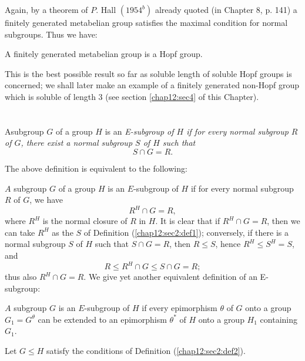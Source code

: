 Again, by a theorem of $P$. Hall $(1954^b)$ already quoted (in Chapter
8, p. 141) a finitely generated metabelian group satisfies the
maximal condition for normal subgroups. Thus we have: 
\begin{corollary}\label{chap12:sec1:coro2}%
  A finitely generated metabelian group is a Hopf group.
\end{corollary}

This is the best possible result so far as soluble length of soluble
Hopf groups is concerned; we shall later make an example of a finitely
generated non-Hopf group which is soluble of length 3 (see section
\ref{chap12:sec4} of this Chapter). 

\section{}\label{chap12:sec2}%

\setcounter{defn}{0}
\begin{defn}\label{chap12:sec2:def1} %
  A\pageoriginale subgroup $G$ of a group $H$ is an \em{E-subgroup} of $H$ if for
  every normal subgroup $R$ of $G$, there exist a normal subgroup $S$
  of $H$ such that  
  $$
  S \cap G=R. 
  $$
\end{defn}

The above definition is equivalent to the following:
\begin{defn}\label{chap12:sec2:def2} %
  $A$ subgroup $G$ of a group $H$ is an $E$-subgroup of $H$ if for
  every normal subgroup $R$ of $G$, we have  
  $$
  R^H \cap G=R,
  $$
  where $R^H$ is the normal closure of $R$ in $H$. It is clear that if
  $R^H \cap G=R$, then we can take $R^H$ as the $S$ of Definition
  (\ref{chap12:sec2:def1}); conversely, if there is a normal subgroup $S$ of $H$ such
  that $S \cap G=R$, then $R \le S$, hence $R^H \le S^H =S$, and  
  $$
  R \le R^H \cap G \le S \cap G = R ;
  $$
  thus also $R^H \cap G=R$. We give yet another equivalent definition
  of an E-subgroup: 
\end{defn} 

\begin{defi*}\label{chap12:sec2:def3} %
  $A$ subgroup $G$ is an $E$-subgroup of $H$ if every epimorphism
  $\theta$ of $G$ onto a group $G_1 = G^{\theta}$ can be extended to
  an epimorphism $\theta^*$ of $H$ onto a group $H_1$ containing
  $G_1$. 
\end{defi*} 
 
Let $G \le H$ satisfy the conditions of Definition (\ref{chap12:sec2:def2}).
 
